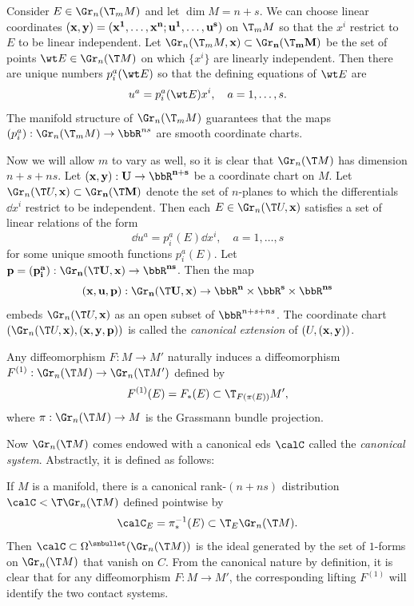 Consider $E\in\Gr_n(\T_m M)$ and let $\dim M=n+s$. We can choose linear coordinates $(\bf{x},\bf{y})=(x^1,\ldots,x^n;u^1,\ldots,u^s)$ on $\T_m M$ so that the $x^i$ restrict to $E$ to be linear independent. Let $\Gr_n(\T_m M,\bf{x})\subset \Gr_n(\T_m M)$ be the set of points $\wt E\in\Gr_n(\T M)$ on which $\{x^i\}$ are linearly independent. Then there are unique numbers $p_i^a(\wt E)$ so that the defining equations of $\wt E$ are 
\[u^a=p^a_i(\wt E)x^i,\quad a=1,\ldots,s.\label{eq 18014}\]
The manifold structure of $\Gr_n(\T_m M)$  guarantees that the maps $(p^a_i):\Gr_n(\T_m M)\to \bbR^{ns}$ are smooth coordinate charts. 

Now we will allow $m$ to vary as well, so it is clear that $\Gr_n(\T M)$ has dimension $n+s+ns$. Let $(\bf{x},\bf{y}):U\to \bbR^{n+s}$ be a coordinate chart on $M$. Let $\Gr_n(\T U,\bf{x})\subset \Gr_n(\T M)$ denote the set of $n$-planes to which the differentials $\dd x^i$ restrict to be independent. Then each $E\in\Gr_n(\T U,\bf{x})$ satisfies a set of linear relations of the form 
\[\dd u^a=p^a_i(E)\dd x^i,\quad a=1,\ldots,s\]
for some unique smooth functions $p_i^a(E)$. Let $\bf{p}=(p^a_i):\Gr_n(\T U,\bf{x})\to \bbR^{ns}$. Then the map 
\[(\bf{x},\bf{u},\bf{p}):\Gr_n(\T U,\bf{x})\to \bbR^n\times\bbR^s\times\bbR^{ns}\]
embeds $\Gr_n(\T U,\bf{x})$ as an open subset of $\bbR^{n+s+ns}$. The coordinate chart $(\Gr_n(\T U,\bf{x}),(\bf{x},\bf{y},\bf{p}))$ is called the \emph{canonical extension} of $(U,(\bf{x},\bf{y}))$.

Any diffeomorphism $F:M\to M'$ naturally induces a diffeomorphism $F^{(1)}:\Gr_n(\T M)\to \Gr_n(\T M')$ defined by 
\[F^{(1)}(E)=F_\ast(E)\subset \T_{F(\pi(E))}M',\]
where $\pi:\Gr_n(\T M)\to M$ is the Grassmann bundle projection. 

Now $\Gr_n(\T M)$ comes endowed with a canonical \gls{eds} $\calC$ called the \emph{canonical system}. Abstractly, it is defined as follows: 

\begin{defn}
    If $M$ is a manifold, there is a canonical rank-$(n+ns)$ distribution $\calC< \T \Gr_n(\T M)$ defined pointwise by 
    \[\calC_E=\pi_\ast^{-1}(E)\subset \T_E\Gr_n(\T M).\]
    Then $\calC\subset\Omega^{\smbullet}(\Gr_n(\T M))$ is the ideal generated by the set of $1$-forms on $\Gr_n(\T M)$ that vanish on $C$. From the canonical nature by definition, it is clear that for any diffeomorphism $F:M\to M'$, the corresponding lifting $F^{(1)}$ will identify the two contact systems.
\end{defn}

